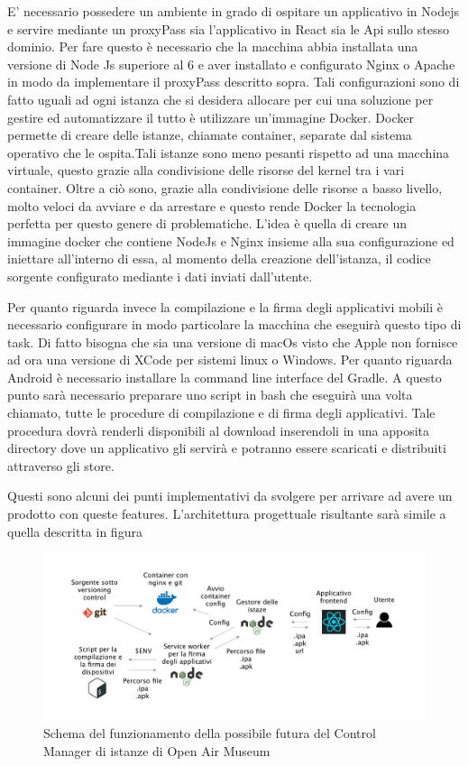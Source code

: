 E’ necessario possedere un ambiente in grado di ospitare un applicativo in Nodejs e servire mediante un proxyPass sia l’applicativo in React sia le Api sullo stesso dominio. Per fare questo è necessario che la macchina abbia installata una versione di Node Js superiore al 6 e aver installato e configurato Nginx o Apache in modo da implementare il proxyPass descritto sopra. Tali configurazioni sono di fatto uguali ad ogni istanza che si desidera allocare per cui una soluzione per gestire ed automatizzare il tutto è utilizzare un'immagine Docker. Docker permette di creare delle istanze, chiamate container, separate dal sistema operativo che le ospita.Tali istanze sono meno pesanti rispetto ad una macchina virtuale, questo grazie alla condivisione delle risorse del kernel tra i vari container. Oltre a ciò sono, grazie alla condivisione delle risorse a basso livello, molto veloci da avviare e da arrestare e questo rende Docker la tecnologia perfetta per questo genere di problematiche.
L’idea è quella di creare un immagine docker che contiene NodeJs e Nginx insieme alla sua configurazione ed iniettare all’interno di essa, al momento della creazione dell’istanza, il codice sorgente configurato mediante i dati inviati dall’utente.\vspace{5mm}

Per quanto riguarda invece la compilazione e la firma degli applicativi mobili è necessario configurare in modo particolare la macchina che eseguirà questo tipo di task. Di fatto bisogna che sia una versione di macOs visto che Apple non fornisce ad ora una versione di XCode per sistemi linux o Windows. Per quanto riguarda Android è necessario installare la command line interface del Gradle. A questo punto sarà necessario preparare uno script in bash che eseguirà una volta chiamato, tutte le procedure di compilazione e di firma degli applicativi. Tale procedura dovrà renderli disponibili al download inserendoli in una apposita directory dove un applicativo gli servirà e potranno essere scaricati e distribuiti attraverso gli store.\vspace{5mm}

Questi sono alcuni dei punti implementativi da svolgere per arrivare ad avere un prodotto con queste features. L’architettura progettuale risultante sarà simile a quella descritta in figura\vspace{5mm}

\begin{figure}[h]
\centering
\includegraphics[width=1\textwidth]{images/schemaIstanzeAlakai.png}
\caption{Schema del funzionamento della possibile futura del Control Manager di istanze di Open Air Museum}
\end{figure}

